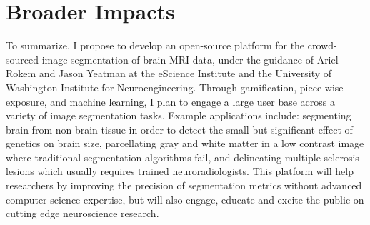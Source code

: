\section*{Broader Impacts}

To summarize, I propose to develop an open-source platform for the crowd-sourced image segmentation of brain MRI data, under the guidance of Ariel Rokem and Jason Yeatman at the eScience Institute and the University of Washington Institute for Neuroengineering. Through gamification, piece-wise exposure, and machine learning, I plan to engage a large user base across a variety of image segmentation tasks. Example applications include: segmenting brain from non-brain tissue in order to detect the small but significant effect of genetics on brain size, parcellating gray and white matter in a low contrast image where traditional segmentation algorithms fail, and delineating multiple sclerosis lesions which usually requires trained neuroradiologists. This platform will help researchers by improving the precision of segmentation metrics without advanced computer science expertise, but will also engage, educate and excite the public on cutting edge neuroscience research. 
